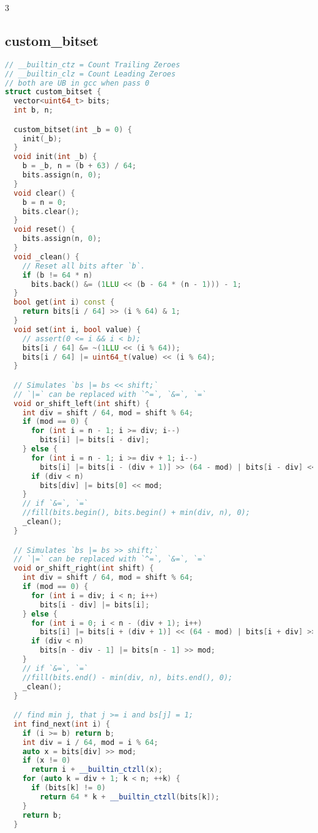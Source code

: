 \documentclass[9pt,a4paper,landscape,twosided]{extarticle}
\begin{document}
\begin{multicols*}{3}
\subsection{custom\_bitset}
\begin{lstlisting}[language=C++]
// __builtin_ctz = Count Trailing Zeroes
// __builtin_clz = Count Leading Zeroes
// both are UB in gcc when pass 0
struct custom_bitset {
  vector<uint64_t> bits;
  int b, n;

  custom_bitset(int _b = 0) {
    init(_b);
  }
  void init(int _b) {
    b = _b, n = (b + 63) / 64;
    bits.assign(n, 0);
  }
  void clear() {
    b = n = 0;
    bits.clear();
  }
  void reset() {
    bits.assign(n, 0);
  }
  void _clean() {
    // Reset all bits after `b`.
    if (b != 64 * n)
      bits.back() &= (1LLU << (b - 64 * (n - 1))) - 1;
  }
  bool get(int i) const {
    return bits[i / 64] >> (i % 64) & 1;
  }
  void set(int i, bool value) {
    // assert(0 <= i && i < b);
    bits[i / 64] &= ~(1LLU << (i % 64));
    bits[i / 64] |= uint64_t(value) << (i % 64);
  }

  // Simulates `bs |= bs << shift;`
  // `|=` can be replaced with `^=`, `&=`, `=`
  void or_shift_left(int shift) {
    int div = shift / 64, mod = shift % 64;
    if (mod == 0) {
      for (int i = n - 1; i >= div; i--)
        bits[i] |= bits[i - div];
    } else {
      for (int i = n - 1; i >= div + 1; i--)
        bits[i] |= bits[i - (div + 1)] >> (64 - mod) | bits[i - div] << mod;
      if (div < n)
        bits[div] |= bits[0] << mod;
    }
    // if `&=`, `=`
    //fill(bits.begin(), bits.begin() + min(div, n), 0);
    _clean();
  }

  // Simulates `bs |= bs >> shift;`
  // `|=` can be replaced with `^=`, `&=`, `=`
  void or_shift_right(int shift) {
    int div = shift / 64, mod = shift % 64;
    if (mod == 0) {
      for (int i = div; i < n; i++)
        bits[i - div] |= bits[i];
    } else {
      for (int i = 0; i < n - (div + 1); i++)
        bits[i] |= bits[i + (div + 1)] << (64 - mod) | bits[i + div] >> mod;
      if (div < n)
        bits[n - div - 1] |= bits[n - 1] >> mod;
    }
    // if `&=`, `=`
    //fill(bits.end() - min(div, n), bits.end(), 0);
    _clean();
  }

  // find min j, that j >= i and bs[j] = 1;
  int find_next(int i) {
    if (i >= b) return b;
    int div = i / 64, mod = i % 64;
    auto x = bits[div] >> mod;
    if (x != 0)
      return i + __builtin_ctzll(x);
    for (auto k = div + 1; k < n; ++k) {
      if (bits[k] != 0)
        return 64 * k + __builtin_ctzll(bits[k]);
    }
    return b;
  }


\end{lstlisting}
\end{multicols*}
\end{document}

